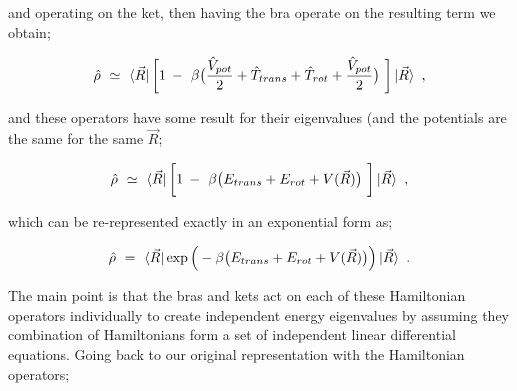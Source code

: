 \documentclass{article}
\begin{document}
and operating on the ket, then having the bra operate on the resulting term we obtain;

\begin{equation} \label{eb-eq-1-224}
\hat{\rho} \hspace{0.125cm} \simeq \hspace{0.125cm} \bra{\vec{R}} \bigg[ 1 \hspace{0.075cm} - \hspace{0.125cm} \beta \big( \frac{\hat{V}_{pot}}{2} + \hat{T}_{trans} + \hat{T}_{rot} + \frac{\hat{V}_{pot}}{2} \big) \hspace{0.125cm} \bigg] \ket{\vec{R}} \hspace{0.125cm} ,
\end{equation}

and these operators have some result for their eigenvalues (and the potentials are the same for the same \begin{math} \vec{R} \end{math};

\begin{equation} \label{eb-eq-1-225}
\hat{\rho} \hspace{0.125cm} \simeq \hspace{0.125cm} \bra{\vec{R}} \bigg[ 1 \hspace{0.075cm} - \hspace{0.125cm} \beta \big( E_{trans} + E_{rot} + V(\vec{R})\big) \hspace{0.125cm} \bigg] \ket{\vec{R}} \hspace{0.125cm} ,
\end{equation}

which can be re-represented exactly in an exponential form as;

\begin{equation} \label{eb-eq-1-226}
\hat{\rho} \hspace{0.125cm} = \hspace{0.125cm} \bra{\vec{R}} \exp \Big( - \beta \big( E_{trans} + E_{rot} + V(\vec{R})\big) \Big) \ket{\vec{R}} \hspace{0.125cm} .
\end{equation}

The main point is that the bras and kets act on each of these Hamiltonian operators individually to create independent energy eigenvalues by assuming they combination of Hamiltonians form a set of independent linear differential equations. Going back to our original representation with the Hamiltonian operators;
\end{document}
